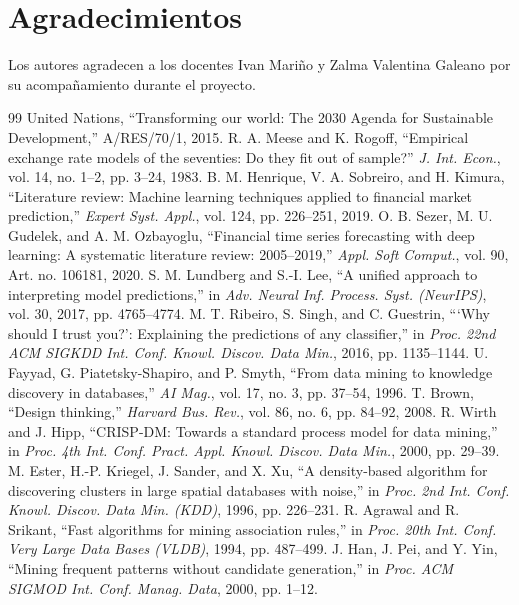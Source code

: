 \documentclass[conference]{IEEEtran}
\begin{document}
\section*{Agradecimientos}
Los autores agradecen a los docentes Ivan Mariño y Zalma Valentina Galeano por su acompañamiento durante el proyecto.

\begin{thebibliography}{99}
 United Nations, ``Transforming our world: The 2030 Agenda for Sustainable Development,'' A/RES/70/1, 2015.
 R. A. Meese and K. Rogoff, ``Empirical exchange rate models of the seventies: Do they fit out of sample?'' \emph{J. Int. Econ.}, vol. 14, no. 1--2, pp. 3--24, 1983.
 B. M. Henrique, V. A. Sobreiro, and H. Kimura, ``Literature review: Machine learning techniques applied to financial market prediction,'' \emph{Expert Syst. Appl.}, vol. 124, pp. 226--251, 2019.
 O. B. Sezer, M. U. Gudelek, and A. M. Ozbayoglu, ``Financial time series forecasting with deep learning: A systematic literature review: 2005--2019,'' \emph{Appl. Soft Comput.}, vol. 90, Art. no. 106181, 2020.
 S. M. Lundberg and S.-I. Lee, ``A unified approach to interpreting model predictions,'' in \emph{Adv. Neural Inf. Process. Syst. (NeurIPS)}, vol. 30, 2017, pp. 4765--4774.
 M. T. Ribeiro, S. Singh, and C. Guestrin, ```Why should I trust you?': Explaining the predictions of any classifier,'' in \emph{Proc. 22nd ACM SIGKDD Int. Conf. Knowl. Discov. Data Min.}, 2016, pp. 1135--1144.
 U. Fayyad, G. Piatetsky-Shapiro, and P. Smyth, ``From data mining to knowledge discovery in databases,'' \emph{AI Mag.}, vol. 17, no. 3, pp. 37--54, 1996.
 T. Brown, ``Design thinking,'' \emph{Harvard Bus. Rev.}, vol. 86, no. 6, pp. 84--92, 2008.
 R. Wirth and J. Hipp, ``CRISP-DM: Towards a standard process model for data mining,'' in \emph{Proc. 4th Int. Conf. Pract. Appl. Knowl. Discov. Data Min.}, 2000, pp. 29--39.
 M. Ester, H.-P. Kriegel, J. Sander, and X. Xu, ``A density-based algorithm for discovering clusters in large spatial databases with noise,'' in \emph{Proc. 2nd Int. Conf. Knowl. Discov. Data Min. (KDD)}, 1996, pp. 226--231.
 R. Agrawal and R. Srikant, ``Fast algorithms for mining association rules,'' in \emph{Proc. 20th Int. Conf. Very Large Data Bases (VLDB)}, 1994, pp. 487--499.
 J. Han, J. Pei, and Y. Yin, ``Mining frequent patterns without candidate generation,'' in \emph{Proc. ACM SIGMOD Int. Conf. Manag. Data}, 2000, pp. 1--12.

\end{thebibliography}
\end{document}
